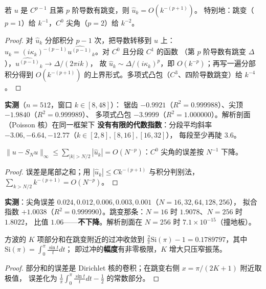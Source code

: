 \begin{theorem}[代数衰减的阶]
若 $u$ 是 $C^{p-1}$ 且第 $p$ 阶导数有跳变，则 $\hat u_k=O(k^{-(p+1)})$。
特别地：跳变（$p=1$）给 $k^{-1}$，$C^0$ 尖角（$p=2$）给 $k^{-2}$。
\end{theorem}

\begin{proof}
对 $\hat u_k$ 分部积分 $p-1$ 次，把导数转移到 $u$ 上：
$\hat u_k=(i\kappa_k)^{-(p-1)}\widehat{u^{(p-1)}}_k$。对 $C^0$ 且分段 $C^1$ 的函数
（第 $p$ 阶导数有跳变 $\Delta$），$\widehat{u^{(p-1)}}_k\to\Delta/(2\pi i k)$，
故 $\hat u_k\sim \Delta/(i\kappa_k)^p$，即 $O(k^{-p})$；再写一遍分部积分得到 $O(k^{-(p+1)})$
的上界形式。多项式凸包（$C^3$、四阶导数跳变）给 $k^{-4}$。
\end{proof}

\textbf{实测}（$n=512$，窗口 $k\in[8,48]$）：
锯齿 $-0.9921$（$R^2=0.999988$）、尖顶 $-1.9840$（$R^2=0.999989$）、
多项式凸包 $-3.9999$（$R^2=1.000000$）。解析剖面（Poisson 核）在同一框架下
\textbf{没有有限的代数指数}：分段平均斜率 $-3.06,-6.64,-12.77$（$k\in[2,8],[8,16],[16,32]$），
每段至少再陡 $3.6$。

\begin{corollary}[逼近误差比系数快一阶]
$\|u-S_Nu\|_\infty\le\sum_{|k|>N/2}|\hat u_k|=O(N^{-p})$：$C^0$ 尖角的误差按 $N^{-1}$ 下降。
\end{corollary}

\begin{proof}
误差是尾部之和；用 $|\hat u_k|\le Ck^{-(p+1)}$ 与积分判别法，
$\sum_{k>N/2}k^{-(p+1)}=O(N^{-p})$。
\end{proof}

\textbf{实测}：尖角误差 $0.024,0.012,0.006,0.003,0.001$（$N=16,32,64,128,256$），
拟合指数 $+1.0038$（$R^2=0.999990$）。跳变那条：$N=16$ 时 $1.9078$、$N=256$ 时 $1.8022$，
比值 $1.06$——\textbf{不下降}。解析剖面在 $N=256$ 时 $7.1\times10^{-15}$（撞地板）。

\begin{theorem}
方波的 $K$ 项部分和在跳变附近的过冲收敛到
$\frac2\pi\mathrm{Si}(\pi)-1=0.1789797$，其中 $\mathrm{Si}(\pi)=\int_0^\pi\frac{\sin t}{t}dt$；
即过冲的\textbf{幅度}有非零极限，$K$ 增大只压窄振荡。
\end{theorem}

\begin{proof}
部分和的误差是 Dirichlet 核的卷积；在跳变右侧 $x=\pi/(2K+1)$ 附近取极值，
误差化为 $\frac1\pi\int_0^\pi\frac{\sin t}{t}dt-\frac12$ 的常数部分。
\end{proof}

